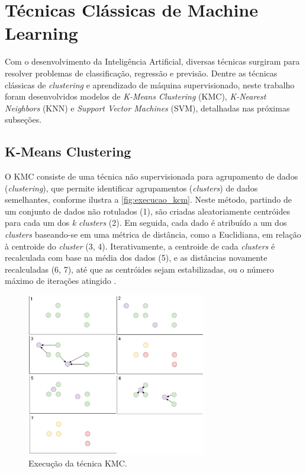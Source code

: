 \section{Técnicas Clássicas de Machine Learning}

Com o desenvolvimento da Inteligência Artificial, diversas técnicas surgiram para resolver problemas de classificação, regressão e previsão. Dentre as técnicas clássicas de \textit{clustering} e aprendizado de máquina supervisionado, neste trabalho foram desenvolvidos modelos de \textit{K-Means Clustering} (KMC), \textit{K-Nearest Neighbors} (KNN) e \textit{Support Vector Machines} (SVM), detalhadas nas próximas subseções.

\subsection{K-Means Clustering}

O KMC consiste de uma técnica não supervisionada para agrupamento de dados (\textit{clustering}), que permite identificar agrupamentos (\textit{clusters}) de dados semelhantes, conforme ilustra a \autoref{fig:execucao_kcm}. Neste método, partindo de um conjunto de dados não rotulados (1), são criadas aleatoriamente centróides para cada um dos \textit{k clusters} (2). Em seguida, cada dado é atribuído a um dos \textit{clusters} baseando-se em uma métrica de distância, como a Euclidiana, em relação à centroide do \textit{cluster} (3, 4). Iterativamente, a centroide de cada \textit{clusters} é recalculada com base na média dos dados (5), e as distâncias novamente recalculadas (6, 7), até que as centróides sejam estabilizadas, ou o número máximo de iterações atingido \cite{foley2019,nisbet2009}.

\begin{figure}[h]
  \centering
  \caption{Execução da técnica KMC.}
   \label{fig:execucao_kcm}
   \includegraphics[width=0.7\textwidth]{figuras/fig_5.png}
\end{figure}

